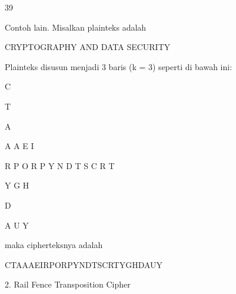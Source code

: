 \documentclass{article}
\begin{document}

39

Contoh lain. Misalkan plainteks adalah 

CRYPTOGRAPHY AND DATA SECURITY 

Plainteks disusun menjadi 3 baris (k = 3) seperti di bawah ini: 

C 

 T 

  A 

   A     A     E       I 

 R   P  O R   P  Y  N  D  T  S  C   R   T 

   Y     G       H 

 D 

  A     U      Y 

maka cipherteksnya adalah 

CTAAAEIRPORPYNDTSCRTYGHDAUY 

2. Rail Fence Transposition Cipher
\end{document}
